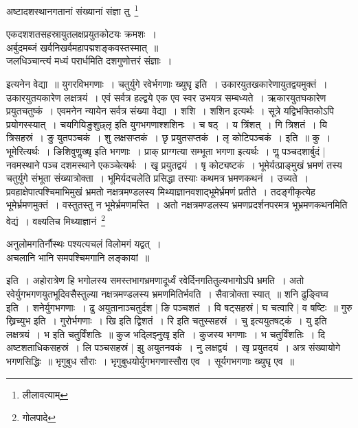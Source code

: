 \documentclass[12pt,a4paper]{report}
\begin{document}
अष्टादशस्थानगतानां संख्यानां संज्ञा तु~\footnote{लीलावत्याम्}

\begin{center}
 \begin{large}
एकदशशतसहस्रायुतलक्षप्रयुतकोटयः क्रमशः~।\\
अर्बुदमब्जं खर्वनिखर्वमहापद्मशङ्कवस्तस्मात्~॥\\
जलधिञ्चान्त्यं मध्यं परार्धमिति दशगुणोत्तरं संज्ञाः~।
 \end{large}
\end{center}

इत्यनेन वेद्या~॥ युगरविभगणाः~। चतुर्युगे रवेर्भगणाः ख्युघृ इति~। उकारयुतखकारेणायुतद्वयमुक्तं~। उकारयुतयकारेण लक्षत्रयं~। एवं सर्वत्र हल्द्वये
एक एव स्वर उभयत्र सम्बध्यते~। ऋकारयुतघकारेण प्रयुतचतुष्कं~। एवमनेन न्यायेन सर्वत्र संख्या वेद्या~। शशि~। शशिन इत्यर्थः~। सूत्रे  यद्विभक्तिकोऽपि प्रयोगस्स्यात्~। चयगियिङुशुछ्लृ इति युगभगणाश्शशिनः~। च षठ्~। य त्रिंशत्~। गि त्रिशतं~। यि त्रिसहस्रं~। ङु युतपञ्चकं~। शु लक्षसप्तकं~। छृ प्रयुतसप्तकं~। लृ कोटिपञ्चकं~। इति~॥ कु~। भूमेरित्यर्थः~। ङिशिवुणॢख्षृ इति भगणाः~। प्राक् प्राग्गत्या सम्भूता भगणा इत्यर्थः~। णॢ पञ्चदशार्बुदं | नवमस्थाने पञ्च दशमस्थाने एकञ्चेत्यर्थः~। खृ प्रयुतद्वयं~। षृ कोट्यष्टकं~। भूमेर्यत्प्राङ्मुखं भ्रमणं तस्य चतुर्युगे संभूता संख्यात्रोक्ता~। भूमिर्यदचलेति प्रसिद्धा तस्याः कथमत्र भ्रमणकथनं~। उच्यते~। प्रवहाक्षेपात्पश्चिमाभिमुखं भ्रमतो नक्षत्रमण्डलस्य मिथ्याज्ञानवशाद्भूमेर्भ्रमणं प्रतीते~। तदङ्गीकृत्येह भूमेर्भ्रमणमुक्तं~। वस्तुतस्तु न भूमेर्भ्रमणमस्ति~। अतो नक्षत्रमण्डलस्य भ्रमणप्रदर्शनपरमत्र भूभ्रमणकथनमिति वेद्यं~। वक्ष्यतिच मिथ्याज्ञानं~\footnote{गोलपादे}

\begin{center}
 \begin{large}
अनुलोमगतिर्नौस्थः पश्यत्यचलं विलोमगं यद्वत्~।\\
अचलानि भानि समपश्चिमगानि लङ्कायां~॥
 \end{large}
\end{center}

इति~। अहोरात्रेण हि भगोलस्य समस्तभागभ्रमणादूर्ध्वं रवेर्दिनगतितुल्यभागोऽपि भ्रमति~। अतो रवेर्युगभगणयुतभूदिवसैस्तुल्या नक्षत्रमण्डलस्य भ्रमणमितिर्भवति~। सैवात्रोक्ता स्यात्~॥ शनि ढुङ्विघ्व इति~। शनेर्युगभगणाः~। ढु अयुतानाञ्चतुर्दश | ङि पञ्चशतं~। वि षट्सहस्रं | घ चत्वारि | व षष्टिः~॥ गुरु ख्रिच्युभ इति~। गुरोर्भगणाः~। खि इति द्विशतं~। रि इति चतुस्सहस्रं~। चु इत्ययुतषट्कं~। यु इति लक्षत्रयं~। भ इति चतुर्विंशतिः~॥ कुज भद्लिझ्नुखृ इति~। कुजस्य भगणाः~। भ चतुर्विंशतिः~। दि अष्टशताधिकसहस्रं~। लि पञ्चसहस्रं | झु अयुतनवकं~। नु लक्षद्वयं~। खृ प्रयुतदयं~। अत्र संख्यायोगे भगणसिद्धिः~॥ भृगुबुध सौराः~। भृगुबुधयोर्युगभगणास्सौरा एव~। सूर्यगभगणाः ख्युघृ एव~॥
\end{document}

